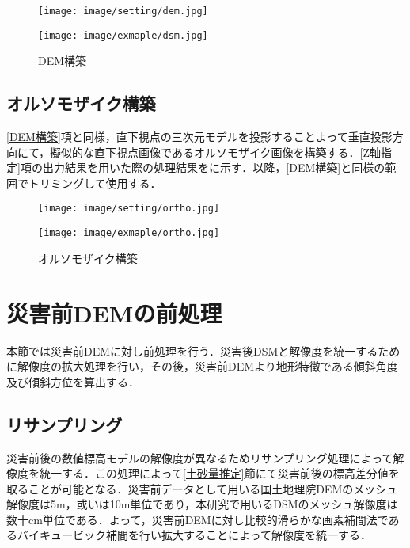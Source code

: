       \begin{figure}[tbp]
        \begin{minipage}[c]{0.45\hsize}
          \centering
          \texttt{[image: image/setting/dem.jpg]}
        \end{minipage}
        \begin{minipage}[c]{0.45\hsize}
          \centering
          \texttt{[image: image/exmaple/dsm.jpg]}
        \end{minipage}
        \caption{DEM構築}
        \label{DEM構築結果}
      \end{figure}


    \subsection{オルソモザイク構築}
      \label{オルソモザイク構築}
      \ref{DEM構築}項と同様，直下視点の三次元モデルを投影することよって垂直投影方向にて，擬似的な直下視点画像であるオルソモザイク画像を構築する．\ref{Z軸指定}項の出力結果を用いた際の処理結果をに示す．以降，\ref{DEM構築}と同様の範囲でトリミングして使用する．

      \begin{figure}[tbp]
        \begin{minipage}[c]{0.45\hsize}
          \centering
          \texttt{[image: image/setting/ortho.jpg]}
        \end{minipage}
        \begin{minipage}[c]{0.45\hsize}
          \centering
          \texttt{[image: image/exmaple/ortho.jpg]}
        \end{minipage}
        \caption{オルソモザイク構築}
        \label{オルソモザイク構築結果}
      \end{figure}



  \section{災害前DEMの前処理}
    \label{災害前DEMの前処理}
    本節では災害前DEMに対し前処理を行う．災害後DSMと解像度を統一するために解像度の拡大処理を行い，その後，災害前DEMより地形特徴である傾斜角度及び傾斜方位を算出する．


    \subsection{リサンプリング}
      \label{リサンプリング}
      災害前後の数値標高モデルの解像度が異なるためリサンプリング処理によって解像度を統一する．この処理によって\ref{土砂量推定}節にて災害前後の標高差分値を取ることが可能となる．災害前データとして用いる国土地理院DEMのメッシュ解像度は5m，或いは10m単位であり，本研究で用いるDSMのメッシュ解像度は数十cm単位である．よって，災害前DEMに対し比較的滑らかな画素補間法であるバイキュービック補間\cite{バイキュービック法}を行い拡大することによって解像度を統一する．
      
